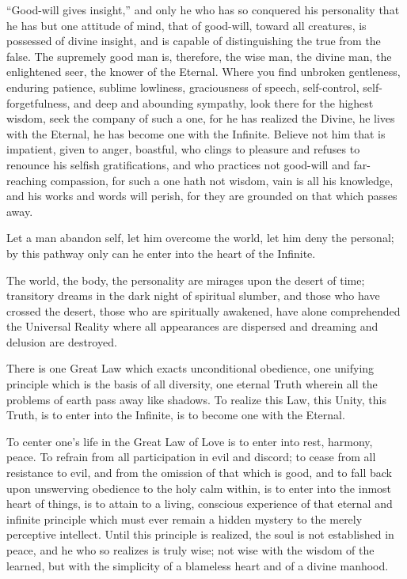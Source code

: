 \documentclass[12pt,oneside]{scrbook}
\begin{document}
  ``Good-will gives insight,'' and only he who has so conquered his
  personality that he has but one attitude of mind, that of good-will,
  toward all creatures, is possessed of divine insight, and is capable of
  distinguishing the true from the false. The supremely good man is,
  therefore, the wise man, the divine man, the enlightened seer, the
  knower of the Eternal. Where you find unbroken gentleness, enduring
  patience, sublime lowliness, graciousness of speech, self-control,
  self-forgetfulness, and deep and abounding sympathy, look there for the
  highest wisdom, seek the company of such a one, for he has realized the
  Divine, he lives with the Eternal, he has become one with the Infinite.
  Believe not him that is impatient, given to anger, boastful, who clings
  to pleasure and refuses to renounce his selfish gratifications, and who
  practices not good-will and far-reaching compassion, for such a one hath
  not wisdom, vain is all his knowledge, and his works and words will
  perish, for they are grounded on that which passes away.
  
  Let a man abandon self, let him overcome the world, let him deny the
  personal; by this pathway only can he enter into the heart of the
  Infinite.
  
  The world, the body, the personality are mirages upon the desert of
  time; transitory dreams in the dark night of spiritual slumber, and
  those who have crossed the desert, those who are spiritually awakened,
  have alone comprehended the Universal Reality where all appearances are
  dispersed and dreaming and delusion are destroyed.
  
  There is one Great Law which exacts unconditional obedience, one
  unifying principle which is the basis of all diversity, one eternal
  Truth wherein all the problems of earth pass away like shadows. To
  realize this Law, this Unity, this Truth, is to enter into the Infinite,
  is to become one with the Eternal.
  
  To center one's life in the Great Law of Love is to enter into rest,
  harmony, peace. To refrain from all participation in evil and discord;
  to cease from all resistance to evil, and from the omission of that
  which is good, and to fall back upon unswerving obedience to the holy
  calm within, is to enter into the inmost heart of things, is to attain
  to a living, conscious experience of that eternal and infinite principle
  which must ever remain a hidden mystery to the merely perceptive
  intellect. Until this principle is realized, the soul is not established
  in peace, and he who so realizes is truly wise; not wise with the wisdom
  of the learned, but with the simplicity of a blameless heart and of a
  divine manhood.
  
\end{document}
